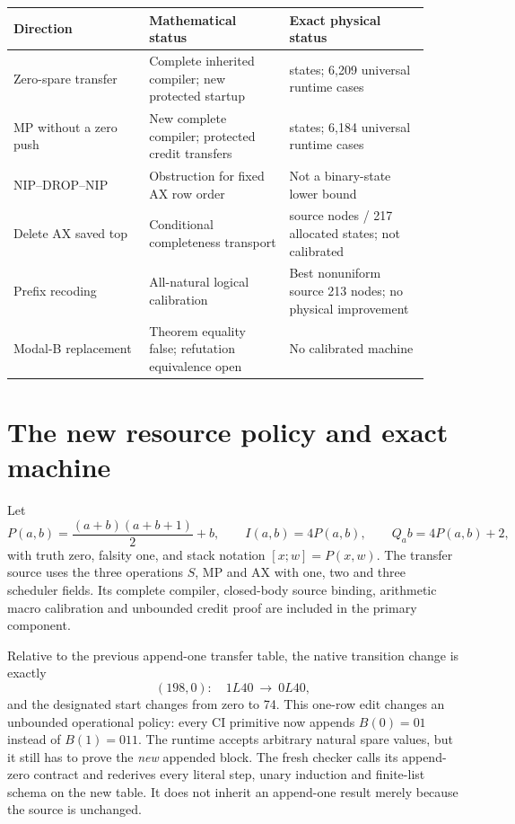 \documentclass[11pt]{article}
\begin{document}
\begin{center}\small
\begin{tabular}{@{}>{\raggedright\arraybackslash}p{0.30\linewidth}>{\raggedright\arraybackslash}p{0.31\linewidth}>{\raggedright\arraybackslash}p{0.31\linewidth}@{}}
\toprule Direction & Mathematical status & Exact physical status\\\midrule
Zero-spare transfer & Complete inherited compiler; new protected startup & 215 states; 6,209 universal runtime cases\\
MP without a zero push & New complete compiler; protected credit transfers & 216 states; 6,184 universal runtime cases\\
NIP--DROP--NIP & Obstruction for fixed AX row order & Not a binary-state lower bound\\
Delete AX saved top & Conditional completeness transport & 204 source nodes / 217 allocated states; not calibrated\\
Prefix recoding & All-natural logical calibration & Best nonuniform source 213 nodes; no physical improvement\\
Modal-B replacement & Theorem equality false; refutation equivalence open & No calibrated machine\\
\bottomrule
\end{tabular}\end{center}

\section{The new resource policy and exact machine}
Let
\[
 P(a,b)=\frac{(a+b)(a+b+1)}2+b,\qquad I(a,b)=4P(a,b),\qquad Q_a b=4P(a,b)+2,
\]
with truth zero, falsity one, and stack notation $[x;w]=P(x,w)$. The transfer source uses the three operations $S$, MP and AX with one, two and three scheduler fields. Its complete compiler, closed-body source binding, arithmetic macro calibration and unbounded credit proof are included in the primary component.

Relative to the previous append-one transfer table, the native transition change is exactly
\[
 (198,0):\quad 1L40\ \longrightarrow\ 0L40,
\]
and the designated start changes from zero to 74. This one-row edit changes an unbounded operational policy: every CI primitive now appends $B(0)=01$ instead of $B(1)=011$. The runtime accepts arbitrary natural spare values, but it still has to prove the \emph{new} appended block. The fresh checker calls its append-zero contract and rederives every literal step, unary induction and finite-list schema on the new table. It does not inherit an append-one result merely because the source is unchanged.
\end{document}
